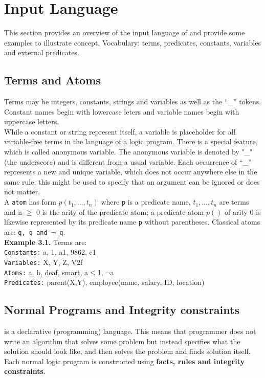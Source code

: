 \documentclass[14pt,a4paper, titlepage]{article}
\begin{document}
\newpage
\section{Input Language}%
This section provides an overview of the input language of \dlvhex{} and provide some examples to illustrate concept. Vocabulary: terms, predicates, constants, variables and external predicates.   
\subsection{Terms and Atoms}
Terms may be integers, constants, strings and variables as well as the \enquote{\_} tokens. Constant names begin with lowercase leters and variable names begin with uppercase letters. \\ While a constant or string represent itself, a variable is placeholder for all variable-free terms in the language of a logic program. There is a special feature, which is called anonymous variable. The anonymous variable is denoted by "\_" (the underscore) and is different from a usual variable. Each occurrence of \enquote{\_} represents a new and unique variable, which does not occur anywhere else in the same rule. this might be used to specify that an argument can be ignored or does not matter.
\\A \texttt{atom} has form \texttt{$p(t_1,\dots,t_n)$} where \texttt{p} is a predicate name, $t_1,\dots,t_n$ are terms and n $\geq$ 0 is the arity of the predicate atom; a predicate atom $p()$ of arity 0 is likewise represented by its predicate name \texttt{p} without parentheses. Classical atoms are: \texttt{q, q and $\neg$ q}.   
\\ \textbf{Example 3.1.} 
Terms are:
\\ \texttt{Constants:} a, 1, a1, 9862, c1
\\ \texttt{Variables:} X, Y, Z, V2f
\\ \texttt{Atoms:} a, b, deaf, smart, a$\leq$1, $\neg$a
\\ \texttt{Predicates:} parent(X,Y), employee(name, salary, ID, location)
       

\subsection{Normal Programs and Integrity constraints}
\dlvhex{} is a declarative (programming) language. This means that programmer does not write an algorithm that solves some problem but instead specifies what the solution should look like, and then solves the problem and finds solution itself. Each normal logic program is constructed using \textbf{facts, rules and integrity constraints}. 
\end{document}
